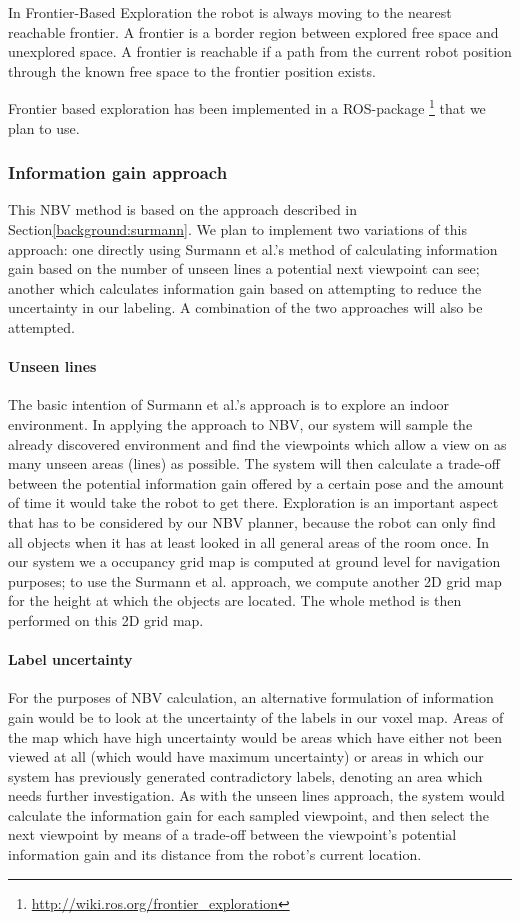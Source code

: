 \documentclass[a4paper,11pt,english]{article}
\begin{document}
In Frontier-Based Exploration the robot is always moving to the nearest reachable frontier.
A frontier is a border region between explored free space and unexplored space.
A frontier is reachable if a path from the current robot position through the known free space to the frontier position exists.

Frontier based exploration has been implemented in a ROS-package \footnote{\url{http://wiki.ros.org/frontier_exploration}} that we plan to use.

\subsubsection{Information gain approach}
This NBV method is based on the approach described in Section\ref{background:surmann}.
We plan to implement two variations of this approach: one directly using Surmann et al.'s method of calculating information gain based on the number of unseen lines a potential next viewpoint can see; another which calculates information gain based on attempting to reduce the uncertainty in our labeling.
A combination of the two approaches will also be attempted.

\paragraph{Unseen lines}
The basic intention of Surmann et al.'s approach is to explore an indoor environment.
In applying the approach to NBV, our system will sample the already discovered environment and find the viewpoints which allow a view on as many unseen areas (lines) as possible.
The system will then calculate a trade-off between the potential information gain offered by a certain pose and the amount of time it would take the robot to get there.
Exploration is an important aspect that has to be considered by our NBV planner, because the robot can only find all objects when it has at least looked in all general areas of the room once.
In our system we a occupancy grid map is computed at ground level for navigation purposes; to use the Surmann et al. approach, we compute another 2D grid map for the height at which the objects are located.
The whole method is then performed on this 2D grid map.

\paragraph{Label uncertainty}
For the purposes of NBV calculation, an alternative formulation of information gain would be to look at the uncertainty of the labels in our voxel map.
Areas of the map which have high uncertainty would be areas which have either not been viewed at all (which would have maximum uncertainty) or areas in which our system has previously generated contradictory labels, denoting an area which needs further investigation.
As with the unseen lines approach, the system would calculate the information gain for each sampled viewpoint, and then select the next viewpoint by means of a trade-off between the viewpoint's potential information gain and its distance from the robot's current location.
\end{document}
